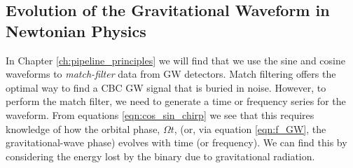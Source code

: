 \subsection{Evolution of the Gravitational Waveform in Newtonian Physics}
\label{sec:0pn_solution}

In Chapter \ref{ch:pipeline_principles} we will find that we use the sine and cosine waveforms to \emph{match-filter} data from \ac{GW} detectors. Match filtering offers the optimal way to find a \ac{CBC} \ac{GW} signal that is buried in noise. However, to perform the match filter, we need to generate a time or frequency series for the waveform. From equations \ref{eqn:cos_sin_chirp} we see that this requires knowledge of how the orbital phase, $\Omega t$, (or, via equation \ref{eqn:f_GW}, the gravitational-wave phase) evolves with time (or frequency). We can find this by considering the energy lost by the binary due to gravitational radiation.

